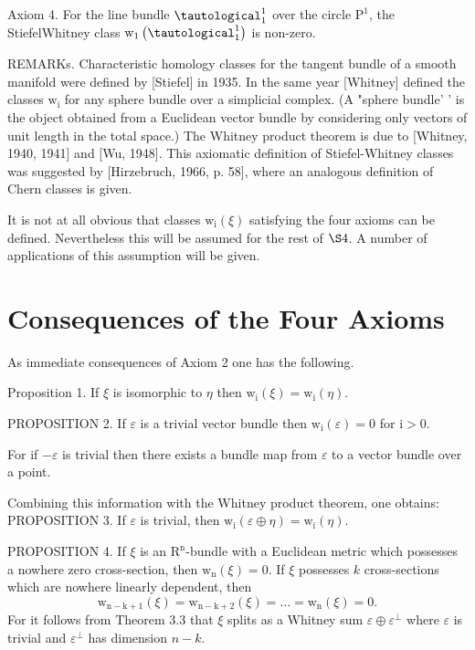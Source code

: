 \documentclass[10pt]{article}
\begin{document}
Axiom 4. For the line bundle $\tautological_{1}^{1}$ over the circle $\mathrm{P}^{1}$, the StiefelWhitney class $\mathrm{w}_{1}\left(\tautological_{1}^{1}\right)$ is non-zero.

REMARKs. Characteristic homology classes for the tangent bundle of a smooth manifold were defined by [Stiefel] in 1935. In the same year [Whitney] defined the classes $\mathrm{w}_{\mathrm{i}}$ for any sphere bundle over a simplicial complex. (A "sphere bundle' ' is the object obtained from a Euclidean vector bundle by considering only vectors of unit length in the total space.) The Whitney product theorem is due to [Whitney, 1940, 1941] and [Wu, 1948]. This axiomatic definition of Stiefel-Whitney classes was suggested by [Hirzebruch, 1966, p. 58], where an analogous definition of Chern classes is given.

It is not at all obvious that classes $\mathrm{w}_{\mathrm{i}}(\xi)$ satisfying the four axioms can be defined. Nevertheless this will be assumed for the rest of $\S 4$. A number of applications of this assumption will be given.

\section{Consequences of the Four Axioms}
As immediate consequences of Axiom 2 one has the following.

Proposition 1. If $\xi$ is isomorphic to $\eta$ then $\mathrm{w}_{\mathrm{i}}(\xi)=\mathrm{w}_{\mathrm{i}}(\eta)$.

PROPOSITION 2. If $\varepsilon$ is a trivial vector bundle then $\mathrm{w}_{\mathrm{i}}(\varepsilon)=0$ for $\mathrm{i}>0$.

For if $-\varepsilon$ is trivial then there exists a bundle map from $\varepsilon$ to a vector bundle over a point.

Combining this information with the Whitney product theorem, one obtains: PROPOSITION 3. If $\varepsilon$ is trivial, then $\mathrm{w}_{\mathrm{i}}(\varepsilon \oplus \eta)=\mathrm{w}_{\mathrm{i}}(\eta)$.

PROPOSITION 4. If $\xi$ is an $\mathrm{R}^{\mathrm{n}}$-bundle with a Euclidean metric which possesses a nowhere zero cross-section, then $\mathrm{w}_{\mathrm{n}}(\xi)=0$. If $\xi$ possesses $k$ cross-sections which are nowhere linearly dependent, then
$$
\mathrm{w}_{\mathrm{n}-\mathrm{k}+1}(\xi)=\mathrm{w}_{\mathrm{n}-\mathrm{k}+2}(\xi)=\ldots=\mathrm{w}_{\mathrm{n}}(\xi)=0 .
$$
For it follows from Theorem $3.3$ that $\xi$ splits as a Whitney sum $\varepsilon \oplus \varepsilon^{\perp}$ where $\varepsilon$ is trivial and $\varepsilon^{\perp}$ has dimension $n-k$.
\end{document}
